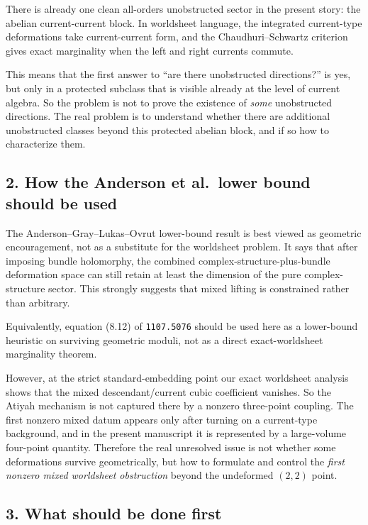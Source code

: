 \documentclass[11pt]{article}
\begin{document}
There is already one clean all-orders unobstructed sector in the present story: the abelian current-current block. In worldsheet language, the integrated current-type deformations take current-current form, and the Chaudhuri--Schwartz criterion gives exact marginality when the left and right currents commute.

This means that the first answer to ``are there unobstructed directions?'' is yes, but only in a protected subclass that is visible already at the level of current algebra. So the problem is not to prove the existence of \emph{some} unobstructed directions. The real problem is to understand whether there are additional unobstructed classes beyond this protected abelian block, and if so how to characterize them.

\subsection*{2. How the Anderson et al.\ lower bound should be used}

The Anderson--Gray--Lukas--Ovrut lower-bound result is best viewed as geometric encouragement, not as a substitute for the worldsheet problem. It says that after imposing bundle holomorphy, the combined complex-structure-plus-bundle deformation space can still retain at least the dimension of the pure complex-structure sector. This strongly suggests that mixed lifting is constrained rather than arbitrary.

Equivalently, equation (8.12) of \texttt{1107.5076} should be used here as a lower-bound heuristic on surviving geometric moduli, not as a direct exact-worldsheet marginality theorem.

However, at the strict standard-embedding point our exact worldsheet analysis shows that the mixed descendant/current cubic coefficient vanishes. So the Atiyah mechanism is not captured there by a nonzero three-point coupling. The first nonzero mixed datum appears only after turning on a current-type background, and in the present manuscript it is represented by a large-volume four-point quantity. Therefore the real unresolved issue is not whether some deformations survive geometrically, but how to formulate and control the \emph{first nonzero mixed worldsheet obstruction} beyond the undeformed $(2,2)$ point.

\subsection*{3. What should be done first}
\end{document}
